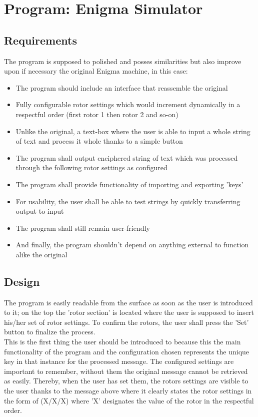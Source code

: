 \documentclass[conference,compsoc]{IEEEtran}
\begin{document}
\section{Program: Enigma Simulator}
\label{sec-production}

\subsection{Requirements}
The program is supposed to polished and posses similarities but also improve upon if necessary the original Enigma machine, in this case:
\begin{itemize}
    \item The program should include an interface that reassemble the original
    \item Fully configurable rotor settings which would increment dynamically in a respectful order (first rotor 1 then rotor 2 and so-on)
    \item Unlike the original, a text-box where the user is able to input a whole string of text and process it whole thanks to a simple button
    \item The program shall output enciphered string of text which was processed through the following rotor settings as configured
    \item The program shall provide functionality of importing and exporting 'keys'
    \item For usability, the user shall be able to test strings by quickly transferring output to input
    \item The program shall still remain user-friendly
    \item And finally, the program shouldn't depend on anything external to function alike the original
\end{itemize}

\subsection{Design}
The program is easily readable from the surface as soon as the user is introduced to it; on the top the 'rotor section' is located where the user is supposed to insert his/her set of rotor settings. To confirm the rotors, the user shall press the 'Set' button to finalize the process.\\
This is the first thing the user should be introduced to because this the main functionality of the program and the configuration chosen represents the unique key in that instance for the processed message. The configured settings are important to remember, without them the original message cannot be retrieved as easily. Thereby, when the user has set them, the rotors settings are visible to the user thanks to the message above where it clearly states the rotor settings in the form of (X/X/X) where 'X' designates the value of the rotor in the respectful order.\\
\end{document}

